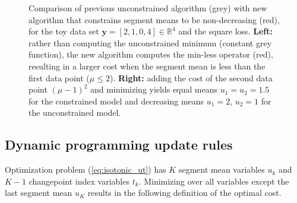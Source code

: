\documentclass{article}
\newtheorem{lemma}{Lemma}
\newcommand{\RR}{\mathbb R}
\begin{document}
\begin{figure}[t!]
  \centering
  
  
  \vskip -0.5cm
  \caption{Comparison of previous unconstrained algorithm
    (\textcolor{Min}{grey}) with new algorithm that constrains segment
    means to be non-decreasing (\textcolor{Ckt}{red}), for the toy data
    set $\mathbf y= [ 2, 1, 0, 4 ] \in\RR^4$ and the square
    loss. \textbf{Left:} rather than computing the unconstrained
    minimum (constant grey function), the new algorithm computes the
    min-less operator (red), resulting in a larger cost when the
    segment mean is less than the first data point ($\mu\leq
    2$). \textbf{Right:} adding the cost of the second data point
    $(\mu-1)^2$ and minimizing yields equal means $u_1=u_2=1.5$ for
    the constrained model and decreasing means $u_1=2,\, u_2=1$ for
    the unconstrained model.}
  \label{fig:compare-unconstrained}
\end{figure}




\subsection{Dynamic programming update rules}
\label{sec:dyn-prog}
Optimization problem (\ref{eq:isotonic_ut}) has $K$ segment mean
variables $u_k$ and $K-1$ changepoint index variables $t_k$. Minimizing over all
variables except the last segment mean $u_K$ results in the following
definition of the optimal cost.
\end{document}
